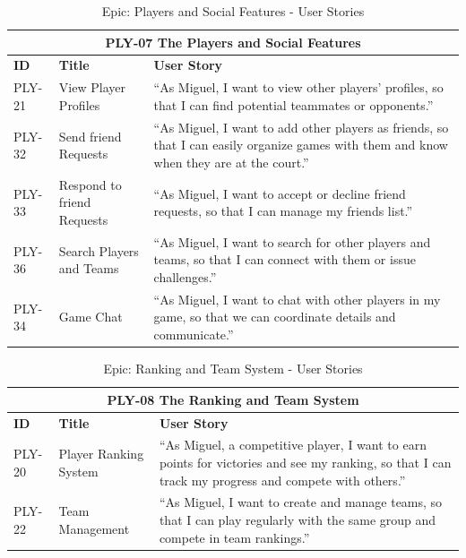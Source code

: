 \begin{table}[h]
	\centering
	\caption{Epic: Players and Social Features - User Stories}
	\label{tab:epic-players-social}
	\begin{tabular}{p{2cm}p{4cm}p{8cm}}
		\toprule
		\multicolumn{3}{c}{\textbf{PLY-07 The Players and Social Features}}\\
		\midrule
		\textbf{ID} & \textbf{Title} & \textbf{User Story} \\
		\midrule
		PLY-21 & View Player Profiles & ``As Miguel, I want to view other players' profiles, so that I can find potential teammates or opponents.'' \\
		\midrule
		PLY-32 & Send friend Requests & ``As Miguel, I want to add other players as friends, so that I can easily organize games with them and know when they are at the court.'' \\
		\midrule
		PLY-33 & Respond to friend Requests & ``As Miguel, I want to accept or decline friend requests, so that I can manage my friends list.'' \\
		\midrule
		PLY-36 & Search Players and Teams & ``As Miguel, I want to search for other players and teams, so that I can connect with them or issue challenges.'' \\
		\midrule
		PLY-34 & Game Chat & ``As Miguel, I want to chat with other players in my game, so that we can coordinate details and communicate.'' \\
		\bottomrule
	\end{tabular}
\end{table}

\begin{table}[h]
	\centering
	\caption{Epic: Ranking and Team System - User Stories}
	\label{tab:epic-ranking-team}
	\begin{tabular}{p{2cm}p{4cm}p{8cm}}
		\toprule
		\multicolumn{3}{c}{\textbf{PLY-08 The Ranking and Team System}}\\
		\midrule
		\textbf{ID} & \textbf{Title} & \textbf{User Story} \\
		\midrule
		PLY-20 & Player Ranking System & ``As Miguel, a competitive player, I want to earn points for victories and see my ranking, so that I can track my progress and compete with others.'' \\
		\midrule
		PLY-22 & Team Management & ``As Miguel, I want to create and manage teams, so that I can play regularly with the same group and compete in team rankings.'' \\
		\bottomrule
	\end{tabular}
\end{table}

